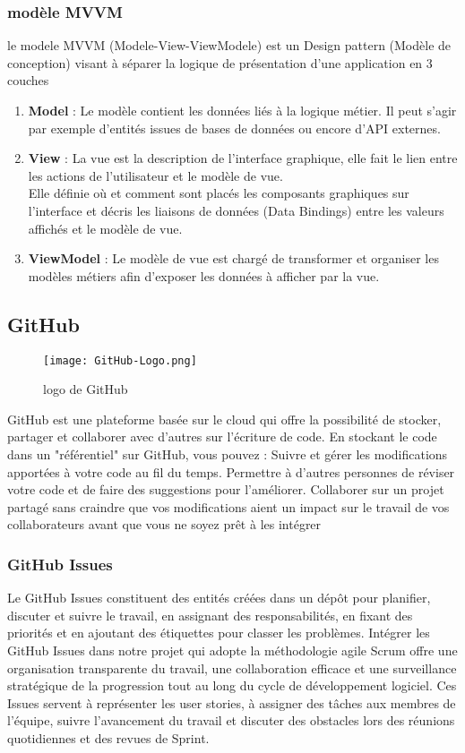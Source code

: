 \subsubsection{modèle MVVM}
le modele MVVM (Modele-View-ViewModele) est un Design pattern (Modèle de conception) visant à séparer la logique de présentation d'une application en 3 couches 
\begin{enumerate}
    \item \textbf{Model} : Le modèle contient les données liés à la logique métier. Il peut s'agir par exemple d'entités issues de bases de données ou encore d'API externes.
    \item \textbf{View} : La vue est la description de l'interface graphique, elle fait le lien entre les actions de l'utilisateur et le modèle de vue.\\ Elle définie où et comment sont placés les composants graphiques sur l'interface et décris les liaisons de données (Data Bindings) entre les valeurs affichés et le modèle de vue.
    \item \textbf{ViewModel} : Le modèle de vue est chargé de transformer et organiser les modèles métiers afin d'exposer les données à afficher par la vue.
\end{enumerate}
\cite{arkancesystemsQuestPattern}

\subsection{GitHub}
\begin{wrapfigure}{r}{0.25\textwidth} 
    \centering
    \texttt{[image: GitHub-Logo.png]}
    \caption{logo de GitHub}
\end{wrapfigure}
GitHub est une plateforme basée sur le cloud  qui offre la possibilité de stocker, partager et collaborer avec d'autres sur l'écriture de code. En stockant le code dans un "référentiel" sur GitHub, vous pouvez :
Suivre et gérer les modifications apportées à votre code au fil du temps.
Permettre à d'autres personnes de réviser votre code et de faire des suggestions pour l'améliorer.
Collaborer sur un projet partagé sans craindre que vos modifications aient un impact sur le travail de vos collaborateurs avant que vous ne soyez prêt à les intégrer

\subsubsection{GitHub Issues}
Le GitHub Issues constituent des entités créées  dans un dépôt pour planifier, discuter et suivre le travail, en assignant des responsabilités, en fixant des priorités et en ajoutant des étiquettes pour classer les problèmes.
Intégrer les GitHub Issues dans notre projet qui adopte la méthodologie agile Scrum offre une organisation transparente du travail, une collaboration efficace et une surveillance stratégique de la progression tout au long du cycle de développement logiciel. Ces Issues servent à représenter les user stories, à assigner des tâches aux membres de l'équipe, suivre l'avancement du travail et discuter des obstacles lors des réunions quotidiennes et des revues de Sprint.
\cite{githubProposGitHub}
